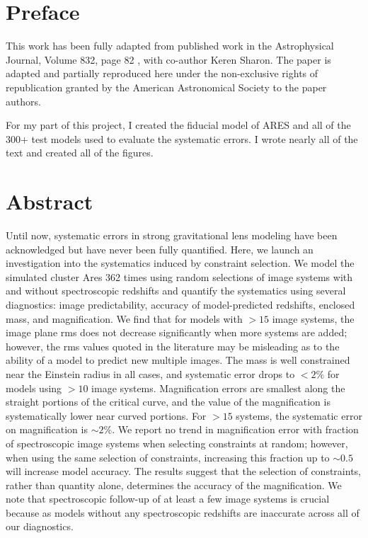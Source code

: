 \section{Preface}

This work has been fully adapted from published work in the Astrophysical Journal, Volume 832, page 82 \citep{Johnson:2016rt}, with co-author Keren Sharon. The paper is adapted and partially reproduced here under the non-exclusive rights of republication granted by the American Astronomical Society to the paper authors.

For my part of this project, I created the fiducial model of ARES and all of the 300+ test models used to evaluate the systematic errors. I wrote nearly all of the text and created all of the figures.

\section{Abstract}
Until now, systematic errors in strong gravitational lens modeling have been acknowledged but have never been fully quantified. Here, we launch an investigation into  the systematics induced by constraint selection. We model the simulated cluster Ares 362 times using random selections of image systems with and without spectroscopic redshifts and quantify the systematics using several diagnostics: image predictability, accuracy of model-predicted redshifts, enclosed mass, and magnification. We find that for models with $>15$ image systems, the image plane rms does not decrease significantly when more systems are added; however, the rms values quoted in the literature may be misleading as to the ability of a model to predict new multiple images. The mass is well constrained near the Einstein radius in all cases, and systematic error drops to $<2\%$ for models using $>10$ image systems. Magnification errors are smallest along the straight portions of the critical curve, and the value of the magnification is systematically lower near curved portions. For $>15$ systems, the systematic error on magnification is $\sim2\%$. We report no trend in magnification error with fraction of spectroscopic image systems when selecting constraints at random; however, when using the same selection of constraints, increasing this fraction up to $\sim0.5$ will increase model accuracy. The results suggest that the selection of constraints, rather than quantity alone, determines the accuracy of the magnification. We note that spectroscopic follow-up of at least a few image systems is crucial because as models without any spectroscopic redshifts are inaccurate across all of our diagnostics.

